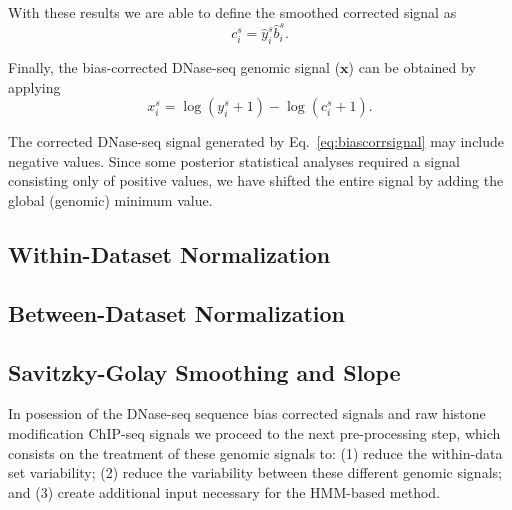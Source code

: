 With these results we are able to define the smoothed corrected signal as
\begin{equation}
  \label{eq:biascorr}
  {c}_{i}^{s} = {\hat{y}}_{i}^{s} {\hat{b}}_{i}^{s}.
\end{equation}

Finally, the bias-corrected DNase-seq genomic signal ($\mathbf{x}$) can be obtained by applying
\begin{equation}
  \label{eq:biascorrsignal}
  {x}_{i}^{s} = \log({y}_{i}^{s} + 1) - \log({c}_{i}^{s} + 1).
\end{equation}

The corrected DNase-seq signal generated by Eq.~\ref{eq:biascorrsignal} may include negative values. Since some posterior statistical analyses required a signal consisting only of positive values, we have shifted the entire signal by adding the global (genomic) minimum value.

\subsection{Within-Dataset Normalization}
\label{sec:withindataset.normalization}


\subsection{Between-Dataset Normalization}
\label{sec:betweendataset.normalization}


\subsection{Savitzky-Golay Smoothing and Slope}
\label{sec:savitzkygolay.smoothing.slope}




In posession of the DNase-seq sequence bias corrected signals and raw histone modification ChIP-seq signals we proceed to the next pre-processing step, which consists on the treatment of these genomic signals to: (1) reduce the within-data set variability; (2) reduce the variability between these different genomic signals; and (3) create additional input necessary for the HMM-based method.

